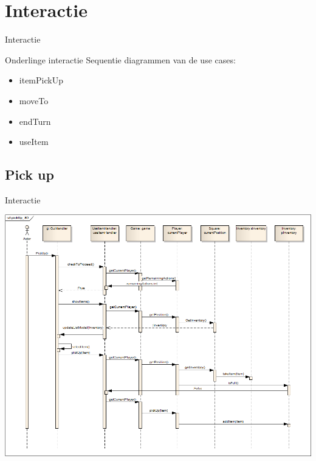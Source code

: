 \documentclass[t]{beamer}
\begin{document}
\section{Interactie}
\begin{frame}{Interactie}
\begin{multicols}{2}
\tableofcontents[currentsection]
\end{multicols}
\end{frame}

\begin{frame}{Onderlinge interactie}
Sequentie diagrammen van de use cases:
\begin{itemize}
	\item itemPickUp
	\item moveTo
	\item endTurn
	\item useItem
\end{itemize}
\end{frame}

\subsection{Pick up}
\begin{frame}{Interactie}
\begin{multicols}{2}
\tableofcontents[currentsection]
\end{multicols}
\end{frame}

\begin{frame}[plain]
\begin{center}
\includegraphics[width= 0.90\linewidth]{../uml/pickup_SD.png}
\end{center}
\end{frame}
\end{document}
